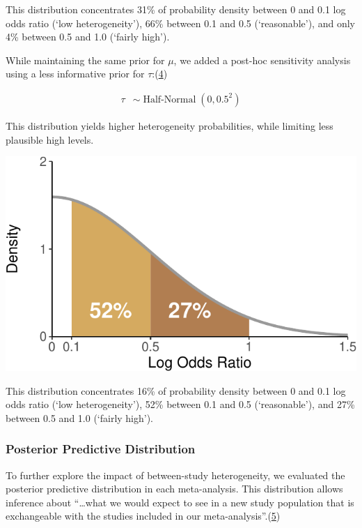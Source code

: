 \documentclass[
  12pt,
]{article}
\begin{document}
This distribution concentrates 31\% of probability density between 0 and
0.1 log odds ratio (`low heterogeneity'), 66\% between 0.1 and 0.5
(`reasonable'), and only 4\% between 0.5 and 1.0 (`fairly high').

\newpage

While maintaining the same prior for \(\mu\), we added a post-hoc
sensitivity analysis using a less informative prior for
\(\tau\):(\protect\hyperlink{ref-rover2021}{4})

\begin{align*}
\tau & \sim \operatorname{Half-Normal}(0, 0.5^2)
\end{align*}

This distribution yields higher heterogeneity probabilities, while
limiting less plausible high levels.

\begin{center}\includegraphics{supplementary_material_files/figure-latex/weakly tau prior visualization-1} \end{center}

This distribution concentrates 16\% of probability density between 0 and
0.1 log odds ratio (`low heterogeneity'), 52\% between 0.1 and 0.5
(`reasonable'), and 27\% between 0.5 and 1.0 (`fairly high').

\hypertarget{posterior-predictive-distribution}{%
\subsubsection{Posterior Predictive
Distribution}\label{posterior-predictive-distribution}}

To further explore the impact of between-study heterogeneity, we
evaluated the posterior predictive distribution in each meta-analysis.
This distribution allows inference about ``\ldots what we would expect
to see in a new study population that is exchangeable with the studies
included in our meta-analysis''.(\protect\hyperlink{ref-welton2020}{5})
\end{document}
